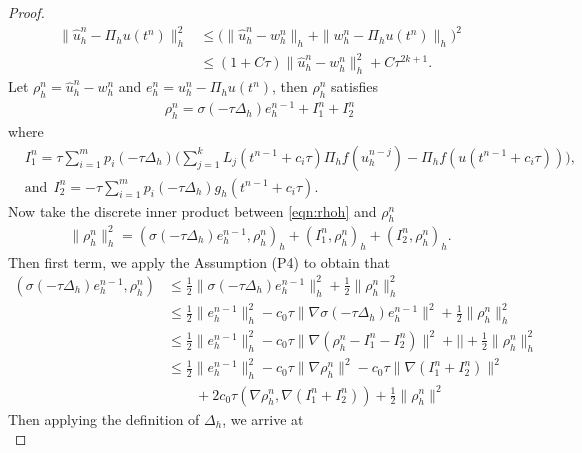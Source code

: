 \documentclass[a4paper, oneside]{book}
\begin{document}
\begin{proof}
\begin{equation}\label{eqn:split}
\begin{split}
\| \hat u_h^n - \Pi_h u(t^n)  \|_h^2 &\le \Big(\| \hat u_h^n - w_h^n \|_h + \|w_h^n - \Pi_h u(t^n)   \|_h \Big)^2 \\
&\le (1+C\tau) \| \hat u_h^n - w_h^n \|_h^2 + C\tau^{2k+1}.
\end{split}
\end{equation}
Let $\rho_h^n = \hat u_h^n  - w_h^n $ and $e_h^n = u_h^n - \Pi_h u(t^n)$, then $\rho_h^n$ satisfies
\begin{align}\label{eqn:rhoh}
\rho_h^n = \sigma(-\tau \Delta_h) e_h^{n-1} + I_1^n + I_2^n
\end{align}
where
\begin{align*}
&  I_1^n = \tau \sum_{i=1}^m p_i(-\tau \Delta_h) \Big(
\sum_{j=1}^{k} L_j (t^{n-1} + c_i\tau) \Pi_h f(u_h^{n-j}) - \Pi_h f(u(t^{n-1}+c_i\tau)) \Big) ,\\
& \text{and}~~
I_2^n = - \tau \sum_{i=1}^m p_i(-\tau \Delta_h) g_h(t^{n-1}+c_i\tau).
\end{align*}
Now take the discrete inner product between \eqref{eqn:rhoh} and $\rho_h^n$
\begin{align*}
 \| \rho_h^n \|_h^2 = (\sigma(-\tau \Delta_h) e_h^{n-1}, \rho_h^n)_h + (I_1^n,\rho_h^n)_h + (I_2^n,\rho_h^n)_h.
\end{align*}
Then first term, we apply the Assumption (P4) to obtain that
\begin{align*}
(\sigma(-\tau \Delta_h) e_h^{n-1}, \rho_h^n) &\le \frac12\|  \sigma(-\tau \Delta_h) e_h^{n-1} \|_h^2 + \frac12\| \rho_h^n\|_h^2 \\
&\le \frac12\|  e_h^{n-1} \|_h^2 - c_0\tau \| \nabla \sigma(-\tau \Delta_h) e_h^{n-1} \|^2 + \frac12\| \rho_h^n\|_h^2\\
&\le \frac12\|  e_h^{n-1} \|_h^2 - c_0\tau \| \nabla (\rho_h^n - I_1^n - I_2^n) \|^2 + |  |+ \frac12\| \rho_h^n\|_h^2\\
&\le \frac12\|  e_h^{n-1} \|_h^2 - c_0\tau \| \nabla \rho_h^n\|^2 - c_0\tau \| \nabla(I_1^n +I_2^n) \|^2\\
&\qquad+2c_0 \tau (\nabla \rho_h^n,\nabla (I_1^n +I_2^n))+ \frac12\| \rho_h^n\|^2
\end{align*}
Then applying the definition of $\Delta_h$, we arrive at
\begin{equation}\label{eqn:rhoh-3}

\end{equation}
\end{proof}
\end{document}
